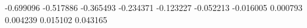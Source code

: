 -0.699096
-0.517886
-0.365493
-0.234371
-0.123227
-0.052213
-0.016005
0.000793
0.004239
0.015102
0.043165

